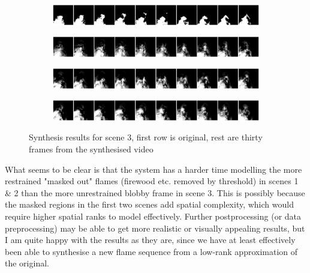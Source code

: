 \documentclass{article}
\begin{document}
\begin{figure}
	\centering
	\begin{subfigure}{\textwidth}
		\includegraphics[width=\textwidth]{visuals/Underconstrained_flicker_g1_c111_f10.png}
	\end{subfigure}
	\begin{subfigure}{\textwidth}
		\includegraphics[width=\textwidth]{visuals/Underconstrained_flicker_g1_c111_s0_synth.png}
	\end{subfigure}
	\begin{subfigure}{\textwidth}
		\includegraphics[width=\textwidth]{visuals/Underconstrained_flicker_g1_c111_s10_synth.png}
	\end{subfigure}
	\begin{subfigure}{\textwidth}
		\includegraphics[width=\textwidth]{visuals/Underconstrained_flicker_g1_c111_s20_synth.png}
	\end{subfigure}
	\caption{Synthesis results for scene 3, first row is original, rest are thirty frames from the synthesised video}
	\label{fig:synthesis-3}
\end{figure}

What seems to be clear is that the system has a harder time modelling the more restrained "masked out" flames (firewood etc. removed by threshold) in scenes 1 \& 2 than the more unrestrained blobby frame in scene 3. This is possibly because the masked regions in the first two scenes add spatial complexity, which would require higher spatial ranks to model effectively. Further postprocessing (or data preprocessing) may be able to get more realistic or visually appealing results, but I am quite happy with the results as they are, since we have at least effectively been able to synthesise a new flame sequence from a low-rank approximation of the original.

\newpage


\end{document}
